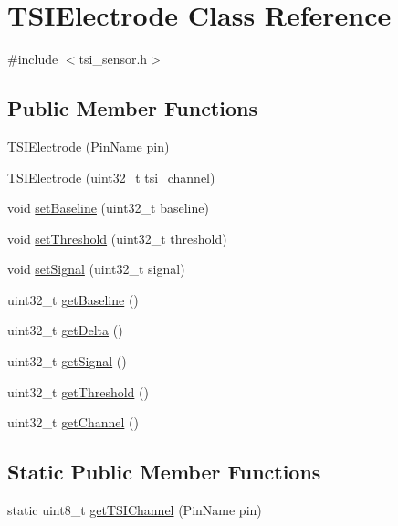 \hypertarget{classTSIElectrode}{}\section{T\+S\+I\+Electrode Class Reference}
\label{classTSIElectrode}


{\ttfamily \#include $<$tsi\+\_\+sensor.\+h$>$}

\subsection*{Public Member Functions}
\begin{DoxyCompactItemize}
\item 
\hyperlink{classTSIElectrode_ae7c382218ea02da45e40cd63a3a462df}{T\+S\+I\+Electrode} (Pin\+Name pin)
\item 
\hyperlink{classTSIElectrode_aeed455fbafb4dfbac6bffdf6e8d8f758}{T\+S\+I\+Electrode} (uint32\+\_\+t tsi\+\_\+channel)
\item 
void \hyperlink{classTSIElectrode_a067cf923f12ac75883ca791f6169a5d7}{set\+Baseline} (uint32\+\_\+t baseline)
\item 
void \hyperlink{classTSIElectrode_a509ce9bfa6a172bbf5b52a13589b8064}{set\+Threshold} (uint32\+\_\+t threshold)
\item 
void \hyperlink{classTSIElectrode_ab2ebce5e4b131246103a6389fa88b014}{set\+Signal} (uint32\+\_\+t signal)
\item 
uint32\+\_\+t \hyperlink{classTSIElectrode_aab2878b3e38dd9a6b68fd697340e5c67}{get\+Baseline} ()
\item 
uint32\+\_\+t \hyperlink{classTSIElectrode_a90af2e96fc3a590de277ce65896ed05d}{get\+Delta} ()
\item 
uint32\+\_\+t \hyperlink{classTSIElectrode_af6f0b27a7191732a5ff80127d2d5abad}{get\+Signal} ()
\item 
uint32\+\_\+t \hyperlink{classTSIElectrode_a46bb496c2d6f0970295495814a957423}{get\+Threshold} ()
\item 
uint32\+\_\+t \hyperlink{classTSIElectrode_abe3608e01af22b12cfa5ec44b511aee3}{get\+Channel} ()
\end{DoxyCompactItemize}
\subsection*{Static Public Member Functions}
\begin{DoxyCompactItemize}
\item 
static uint8\+\_\+t \hyperlink{classTSIElectrode_a8ab372b0aab3b293926c2b2d9b2bc335}{get\+T\+S\+I\+Channel} (Pin\+Name pin)
\end{DoxyCompactItemize}


